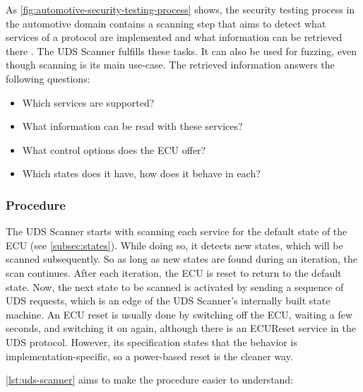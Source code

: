 As \autoref{fig:automotive-security-testing-process} shows, the security testing process in the automotive domain contains a scanning step that aims to detect what services of a protocol are implemented and what information can be retrieved there \cite{Bayer2015}. The UDS Scanner fulfills these tasks. It can also be used for fuzzing, even though scanning is its main use-case. The retrieved information answers the following questions:

\begin{itemize}
\item Which services are supported?
\item What information can be read with these services?
\item What control options does the ECU offer?
\item Which states does it have, how does it behave in each?
\end{itemize}


\subsubsection{Procedure}

The UDS Scanner starts with scanning each service for the default state of the ECU (see \autoref{subsec:states}). While doing so, it detects new states, which will be scanned subsequently. So as long as new states are found during an iteration, the scan continues. After each iteration, the ECU is reset to return to the default state. Now, the next state to be scanned is activated by sending a sequence of UDS requests, which is an edge of the UDS Scanner's internally built state machine. An ECU reset is usually done by switching off the ECU, waiting a few seconds, and switching it on again, although there is an ECUReset service in the UDS protocol. However, its specification states that the behavior is implementation-specific, so a power-based reset is the cleaner way.

\autoref{lst:uds-scanner} aims to make the procedure easier to understand:

